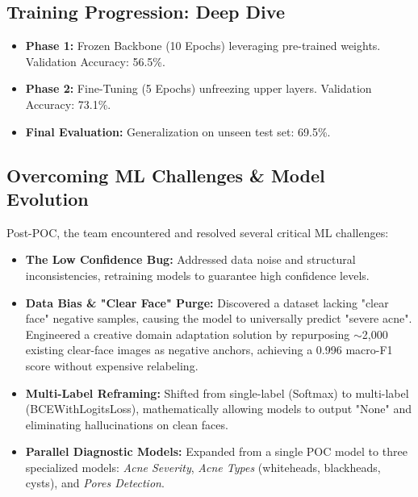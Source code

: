 \documentclass[12pt,a4paper]{article}
\begin{document}
\subsection{Training Progression: Deep Dive}
\begin{itemize}
    \item \textbf{Phase 1:} Frozen Backbone (10 Epochs) leveraging pre-trained weights. Validation Accuracy: 56.5\%.
    \item \textbf{Phase 2:} Fine-Tuning (5 Epochs) unfreezing upper layers. Validation Accuracy: 73.1\%.
    \item \textbf{Final Evaluation:} Generalization on unseen test set: 69.5\%.
\end{itemize}

\subsection{Overcoming ML Challenges \& Model Evolution}
Post-POC, the team encountered and resolved several critical ML challenges:
\begin{itemize}
    \item \textbf{The Low Confidence Bug:} Addressed data noise and structural inconsistencies, retraining models to guarantee high confidence levels.
    \item \textbf{Data Bias \& "Clear Face" Purge:} Discovered a dataset lacking "clear face" negative samples, causing the model to universally predict "severe acne". Engineered a creative domain adaptation solution by repurposing $\sim$2,000 existing clear-face images as negative anchors, achieving a 0.996 macro-F1 score without expensive relabeling.
    \item \textbf{Multi-Label Reframing:} Shifted from single-label (Softmax) to multi-label (BCEWithLogitsLoss), mathematically allowing models to output "None" and eliminating hallucinations on clean faces.
    \item \textbf{Parallel Diagnostic Models:} Expanded from a single POC model to three specialized models: \textit{Acne Severity}, \textit{Acne Types} (whiteheads, blackheads, cysts), and \textit{Pores Detection}.
\end{itemize}
\end{document}
